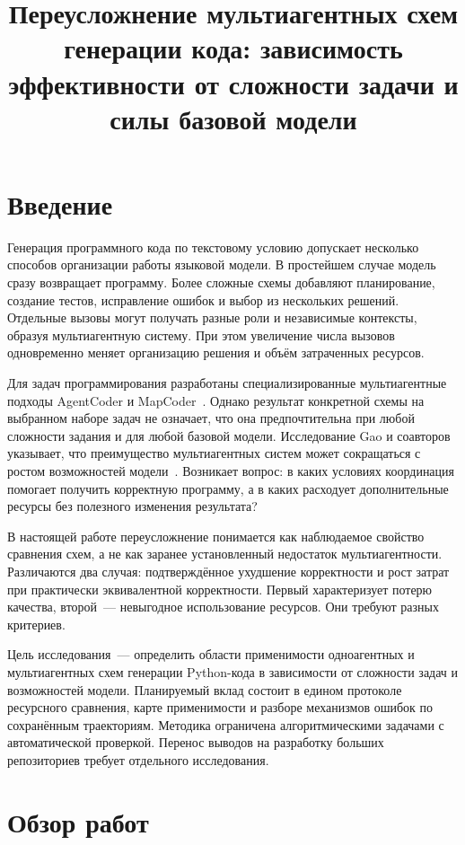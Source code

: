 \documentclass{misisarticle}
\title{Переусложнение мультиагентных схем генерации кода: зависимость эффективности от сложности задачи и силы базовой модели}
\begin{document}
\maketitle
\section{Введение}
Генерация программного кода по текстовому условию допускает несколько способов организации работы языковой модели. В простейшем случае модель сразу возвращает программу. Более сложные схемы добавляют планирование, создание тестов, исправление ошибок и выбор из нескольких решений. Отдельные вызовы могут получать разные роли и независимые контексты, образуя мультиагентную систему. При этом увеличение числа вызовов одновременно меняет организацию решения и объём затраченных ресурсов.

Для задач программирования разработаны специализированные мультиагентные подходы AgentCoder и MapCoder~\cite{agentcoder,mapcoder}. Однако результат конкретной схемы на выбранном наборе задач не означает, что она предпочтительна при любой сложности задания и для любой базовой модели. Исследование Gao и соавторов указывает, что преимущество мультиагентных систем может сокращаться с ростом возможностей модели~\cite{hybrid}. Возникает вопрос: в каких условиях координация помогает получить корректную программу, а в каких расходует дополнительные ресурсы без полезного изменения результата?

В настоящей работе переусложнение понимается как наблюдаемое свойство сравнения схем, а не как заранее установленный недостаток мультиагентности. Различаются два случая: подтверждённое ухудшение корректности и рост затрат при практически эквивалентной корректности. Первый характеризует потерю качества, второй~--- невыгодное использование ресурсов. Они требуют разных критериев.

Цель исследования~--- определить области применимости одноагентных и мультиагентных схем генерации Python-кода в зависимости от сложности задач и возможностей модели. Планируемый вклад состоит в едином протоколе ресурсного сравнения, карте применимости и разборе механизмов ошибок по сохранённым траекториям. Методика ограничена алгоритмическими задачами с автоматической проверкой. Перенос выводов на разработку больших репозиториев требует отдельного исследования.

\section{Обзор работ}
\end{document}
